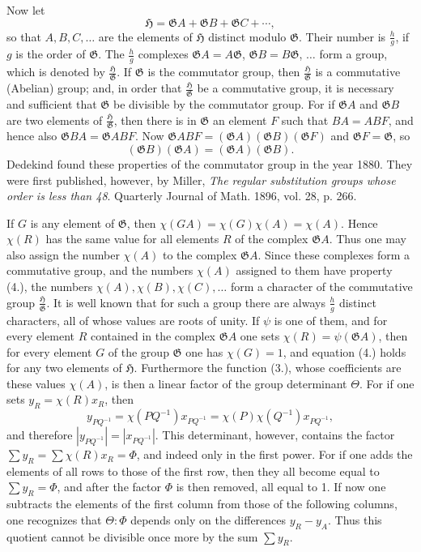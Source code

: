 \documentclass[11pt]{article}
\newcommand{\Hgrp}{\mathfrak{H}}
\newcommand{\Ggrp}{\mathfrak{G}}
\begin{document}
Now let
\[
\Hgrp=\Ggrp A+\Ggrp B+\Ggrp C+\cdots,
\]
so that $A,B,C,\ldots$ are the elements of $\Hgrp$ distinct modulo $\Ggrp$. Their number is $\frac{h}{g}$, if $g$ is the order of $\Ggrp$. The $\frac{h}{g}$ complexes $\Ggrp A=A\Ggrp$, $\Ggrp B=B\Ggrp$, $\ldots$ form a group, which is denoted by $\frac{\Hgrp}{\Ggrp}$. If $\Ggrp$ is the commutator group, then $\frac{\Hgrp}{\Ggrp}$ is a commutative (Abelian) group; and, in order that $\frac{\Hgrp}{\Ggrp}$ be a commutative group, it is necessary and sufficient that $\Ggrp$ be divisible by the commutator group. For if $\Ggrp A$ and $\Ggrp B$ are two elements of $\frac{\Hgrp}{\Ggrp}$, then there is in $\Ggrp$ an element $F$ such that $BA=ABF$, and hence also $\Ggrp BA=\Ggrp ABF$. Now $\Ggrp ABF=(\Ggrp A)(\Ggrp B)(\Ggrp F)$ and $\Ggrp F=\Ggrp$, so
\[
(\Ggrp B)(\Ggrp A)=(\Ggrp A)(\Ggrp B).
\]
Dedekind found these properties of the commutator group in the year 1880. They were first published, however, by Miller, \emph{The regular substitution groups whose order is less than 48}. Quarterly Journal of Math. 1896, vol. 28, p. 266.

If $G$ is any element of $\Ggrp$, then $\chi(GA)=\chi(G)\chi(A)=\chi(A)$. Hence $\chi(R)$ has the same value for all elements $R$ of the complex $\Ggrp A$. Thus one may also assign the number $\chi(A)$ to the complex $\Ggrp A$. Since these complexes form a commutative group, and the numbers $\chi(A)$ assigned to them have property (4.), the numbers $\chi(A),\chi(B),\chi(C),\ldots$ form a character of the commutative group $\frac{\Hgrp}{\Ggrp}$. It is well known that for such a group there are always $\frac{h}{g}$ distinct characters, all of whose values are roots of unity. If $\psi$ is one of them, and for every element $R$ contained in the complex $\Ggrp A$ one sets $\chi(R)=\psi(\Ggrp A)$, then for every element $G$ of the group $\Ggrp$ one has $\chi(G)=1$, and equation (4.) holds for any two elements of $\Hgrp$. Furthermore the function (3.), whose coefficients are these values $\chi(A)$, is then a linear factor of the group determinant $\Theta$. For if one sets $y_R=\chi(R)x_R$, then
\[
y_{PQ^{-1}}=\chi(PQ^{-1})x_{PQ^{-1}}=\chi(P)\chi(Q^{-1})x_{PQ^{-1}},
\]
and therefore $|y_{PQ^{-1}}|=|x_{PQ^{-1}}|$. This determinant, however, contains the factor $\sum y_R=\sum\chi(R)x_R=\Phi$, and indeed only in the first power. For if one adds the elements of all rows to those of the first row, then they all become equal to $\sum y_R=\Phi$, and after the factor $\Phi$ is then removed, all equal to 1. If now one subtracts the elements of the first column from those of the following columns, one recognizes that $\Theta:\Phi$ depends only on the differences $y_R-y_A$. Thus this quotient cannot be divisible once more by the sum $\sum y_R$.
\end{document}
